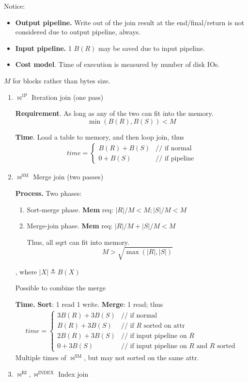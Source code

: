 \documentclass[a4paper]{report}
\begin{document}
Notice:
\begin{itemize}
\item \textbf{Output pipeline.} Write out of the join result at the end/final/return is not considered due to output pipeline, always.
\item \textbf{Input pipeline.} 1 $B(R)$ may be saved due to input pipeline. 
\item \textbf{Cost model}. Time of execution is measured by number of disk IOs. 
\end{itemize}

$M$ for blocks rather than bytes size. 

\begin{enumerate}
\item $\bowtie^{\text{1P}}$ Iteration join (one pass)

\textbf{Requirement}. As long as any of the two can fit into the memory. 
$$
\min(B(R), B(S)) < M
$$

\textbf{Time}. Load a table to memory, and then loop join, thus
\begin{eqnarray*}
time = \left\{ \begin{array}{rl}
  B(R)+B(S) &\text{// if normal }\\
  0+B(S) &\text{// if pipeline}
       \end{array} \right.
\end{eqnarray*}
\item $\bowtie^\text{SM}$ Merge join (two passes)

\textbf{Process.} Two phases:
\begin{enumerate}
\item Sort-merge phase. \textbf{Mem} req: $|R|/M<M; |S|/M<M $
\item Merge-join phase. \textbf{Mem} req: $|R|/M+|S|/M <M$

Thus, all sqrt can fit into memory. 
$$
M>\sqrt{\max{(|R|,|S|)}}
$$
\end{enumerate}

, where $|X|\triangleq B(X)$

Possible to combine the merge 

\textbf{Time.} \textbf{Sort}: 1 read 1 write. \textbf{Merge}: 1 read; thus 
\begin{eqnarray*}
time = \left\{ \begin{array}{rl}
  3B(R)+3B(S) &\text{// if normal} \\
  B(R)+3B(S) &\text{// if $R$ sorted on attr} \\
  2B(R)+3B(S) &\text{// if input pipeline on $R$}\\
  0+3B(S) &\text{// if input pipeline on $R$ and $R$ sorted}
       \end{array} \right.
\end{eqnarray*}
Multiple times of $\bowtie^\text{SM}$, but may not sorted on the same attr. 
\item $\bowtie^\text{RI}, \bowtie^\text{INDEX}$ Index join 


\end{enumerate}
\end{document}
